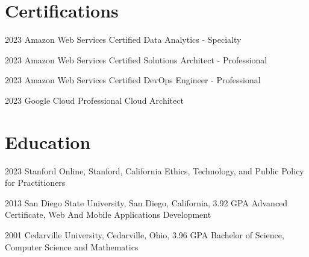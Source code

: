 \documentclass{article}
\begin{document}
\section{Certifications}

\education
  {2023}
  {Amazon Web Services}
  {Certified Data Analytics - Specialty}

\education
  {2023}
  {Amazon Web Services}
  {Certified Solutions Architect - Professional}

\education
  {2023}
  {Amazon Web Services}
  {Certified DevOps Engineer - Professional}

\education
  {2023}
  {Google Cloud}
  {Professional Cloud Architect}


\section{Education}

\education
  {2023}
  {Stanford Online, Stanford, California}
  {Ethics, Technology, and Public Policy for Practitioners}

\education
  {2013}
  {San Diego State University, San Diego, California, 3.92 GPA}
  {Advanced Certificate, Web And Mobile Applications Development}

\education
  {2001}
  {Cedarville University, Cedarville, Ohio, 3.96 GPA}
  {Bachelor of Science, Computer Science and Mathematics}


\credits
\end{document}
